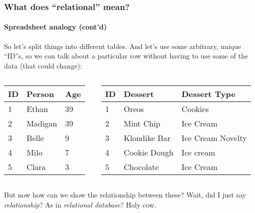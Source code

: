 \documentclass{beamer}
\begin{document}
\begin{frame}
  \frametitle{What does ``relational'' mean?}
  \framesubtitle{Spreadsheet analogy (cont'd)}

  So let's split things into different tables. And let's use some arbitrary,
  unique ``ID''s, so we can talk about a particular row without having to use
  some of the data (that could change):

  \begin{columns}[T]
    \begin{column}{0.3\textwidth}
      \noindent
      \begin{table}[]
        \footnotesize
        \begin{tabular}{@{}lll@{}}
          \toprule
          ID & Person  & Age \\ \midrule
          1  & Ethan   & 39  \\
          2  & Madigan & 39  \\
          3  & Belle   & 9   \\
          4  & Milo    & 7   \\
          5  & Clara   & 3   \\ \bottomrule
        \end{tabular}
      \end{table}
    \end{column}
    \begin{column}{0.5\textwidth}
      \begin{table}[]
        \footnotesize
        \begin{tabular}{@{}lll@{}}
          \toprule
          ID & Dessert      & Dessert Type      \\ \midrule
          1  & Oreos        & Cookies           \\
          2  & Mint Chip    & Ice Cream         \\
          3  & Klondike Bar & Ice Cream Novelty \\
          4  & Cookie Dough & Ice cream         \\
          5  & Chocolate    & Ice Cream         \\ \bottomrule
        \end{tabular}
      \end{table}
    \end{column}
  \end{columns}

  \vspace{1em}

  But now how can we show the relationship between these? Wait, did I just
  say \emph{relationship}? As in \emph{relational database}? Holy cow.
\end{frame}
\end{document}
